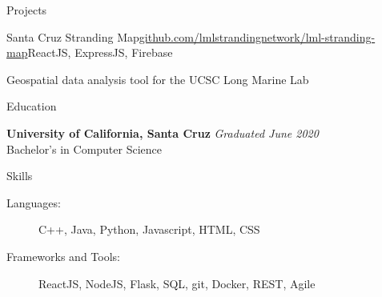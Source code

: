 \documentclass{resume} %
\begin{document}
\begin{rSection}{Projects}

    \begin{rSubsection}{Santa Cruz Stranding Map}{\href{https://github.com/lmlstrandingnetwork/lml-stranding-map}{github.com/lmlstrandingnetwork/lml-stranding-map}}{ReactJS, ExpressJS, Firebase}{}
        \item Geospatial data analysis tool for the UCSC Long Marine Lab
    \end{rSubsection}

\end{rSection}


\begin{rSection}{Education}

    {\bf University of California, Santa Cruz} \hfill {\em Graduated June 2020} \\ 
    Bachelor's in Computer Science

\end{rSection}


\begin{rSection}{Skills}
    \begin{description}
    \item[Languages:] C++, Java, Python, Javascript, HTML, CSS
    \item[Frameworks and Tools:] ReactJS, NodeJS, Flask, SQL, git, Docker, REST, Agile
    \end{description}
\end{rSection}





\end{document}
